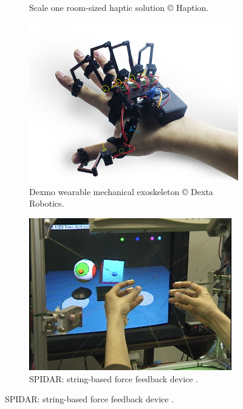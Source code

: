 \begin{figure}[htb]
\begin{subfigure}{.35\textwidth}
    \caption{Scale one room-sized haptic solution \copyright{} Haption.}
    \label{fig:1_hi:scale1}
  \end{subfigure}
  \begin{subfigure}{.3\textwidth}
    \centering
    \includegraphics[width=\linewidth]{figures/ch1/dexmo}
    \caption{Dexmo\textregistered{} wearable mechanical exoskeleton \copyright{} Dexta Robotics.}
    \label{fig:1_hi:dexmo}
  \end{subfigure} 
  \begin{subfigure}{.35\textwidth}
    \centering
    \includegraphics[width=0.9\linewidth]{figures/ch1/spidar}
    \caption{SPIDAR: string-based force feedback device \citep{Sato2002SPIDAR}.}
    \label{fig:1_hi:spidar}
  \end{subfigure}

\end{figure}
